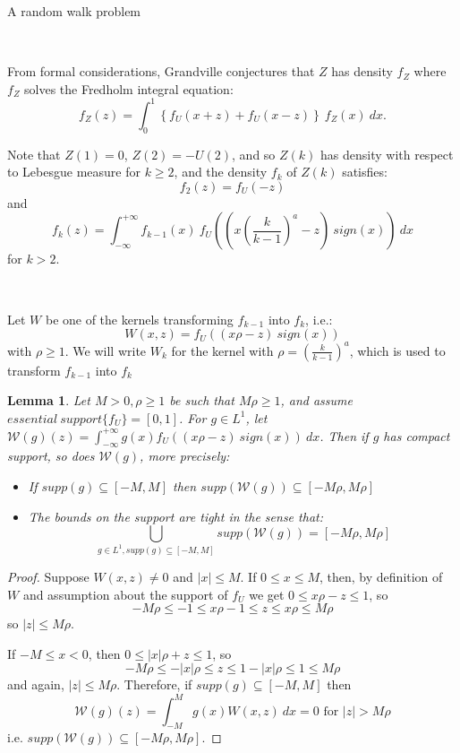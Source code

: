\documentclass[12pt]{article}
\newtheorem*{lmm}{Lemma}
\begin{document}
\begin{section}{A random walk problem}
\

\

From formal considerations, Grandville conjectures that $Z$ has density $f_Z$ where $f_Z$ solves the Fredholm integral equation:
\begin{equation} \label{eq:f_Z}
f_Z(z) = \int_{0}^1 \left\{ f_U(x+z) + f_U(x-z) \right\} \ f_Z(x) \ dx .
\end{equation} 

Note that $Z(1)=0$, $Z(2) = -U(2)$, and so $Z(k)$ has density with respect to Lebesgue measure for $k \ge 2$, and the density $f_k$ of $Z(k)$ satisfies:  
$$
f_2(z) = f_U(-z)
$$
and
$$
f_k(z) = \int_{-\infty}^{+\infty} f_{k-1}(x)\ f_U\!\left(  \left(x \left(\frac{k}{k-1}\right)^a - z \right)\ sign(x) \right) \ dx  
$$
for $k > 2$.  
\

\

Let $W$ be one of the kernels transforming $f_{k-1}$ into $f_k$, i.e.:
$$
W(x,z) = f_U\!\left(  \left(x \rho - z \right)\ sign(x) \right)
$$
with $\rho \ge 1$. We will write $W_k$ for the kernel with $\rho = (\frac{k}{k-1})^a$, which is used to transform $f_{k-1}$ into $f_k$

\begin{lmm}{} Let $M>0,\rho \ge 1$ be such that $M \rho \ge 1$, and assume  $essential \ support \{ f_U \} = [0,1]$. For $g \in L^1$, let $\mathcal{W}(g)(z)=\int_{-\infty}^{+\infty} g(x) f_U\!\left(  \left(x \rho - z \right)\ sign(x) \right) \ dx$. Then if $g$ has compact support, so does $\mathcal{W}(g)$, more precisely:
\begin{itemize}
	\item[a)] If $supp(g) \subseteq [-M,M]$ then $supp(\mathcal{W}(g)) \subseteq [-M \rho,M \rho]$  
	\item[b)] The bounds on the support are tight in the sense that: 
	$$
	\bigcup_{g \in L^1 , supp(g) \subseteq [-M,M]} supp(\mathcal{W}(g))  = 
	\left[-M \rho, M \rho \right]
	$$
\end{itemize}
\end{lmm} 

\begin{proof} Suppose $W(x,z) \ne 0$ and $|x| \le M$. If $0 \le x \le M$, then, by definition of $W$ and assumption about the support of $f_U$ we get $0 \le x \rho - z \le 1$, so 
\begin{equation*}
-M \rho \le -1 \le x \rho - 1 \le z \le x \rho \le M \rho
\end{equation*}
so $|z| \le M \rho$. 

If  $ - M \le x < 0$, then  $0 \le |x| \rho + z \le 1$, so 
\begin{equation*}
-M \rho \le - |x| \rho  \le z \le 1 - |x| \rho \le 1 \le M \rho
\end{equation*}
and again, $|z| \le M \rho$. Therefore, if $supp(g) \subseteq [-M,M]$ then 
$$
\mathcal{W}(g)(z) = \int_{-M}^{M} g(x) W(x,z) \ dx = 0 \text{ for $|z| > M \rho$}
$$ i.e. $supp(\mathcal{W}(g)) \subseteq [-M \rho, M \rho]$.  


\end{proof}
\end{section}
\end{document}
